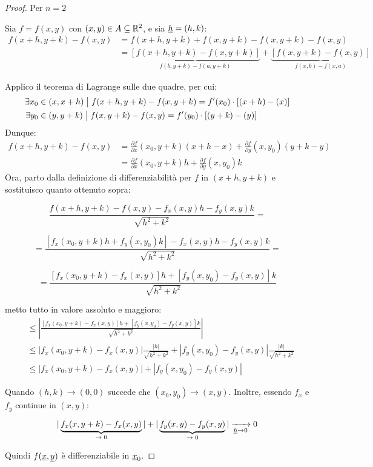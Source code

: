 \begin{proof}
    Per \(n=2\)

    Sia \(f = f(x,y)\) con \((x,y) \in A \subseteq \mathbb{R}^{2}\), e sia \(\underline{h} = (h,k)\):
    \begin{align*}
        f(x+h,y+k) - f(x,y) & = f(x+h,y+k) + f(x,y+k) - f(x,y+k) - f(x,y)                                                                        \\
                            & = \underbrace{[f(x+h,y+k) - f(x,y+k) ]}_{f(b,y+k) - f(a,y+k)} + \underbrace{[f(x,y+k) - f(x,y)]}_{f(x,b) - f(x,a)}
    \end{align*}

    Applico il teorema di Lagrange sulle due quadre, per cui:
    \begin{align*}
        \exists x_0 & \in (x,x+h) \;\big|\; f(x+h,y+k)-f(x,y+k) = f'(x_0) \cdot [(x+h)-(x)] \\
        \exists y_0 & \in (y,y+k) \;\big|\; f(x,y+k)-f(x,y) = f'(y_0) \cdot [(y+k)-(y)]
    \end{align*}
    Dunque:
    \begin{align*}
        f(x+h,y+k) - f(x,y) & = \frac{\partial f}{\partial x}(x_0,y+k) (x +h -x) + \frac{\partial f}{\partial y}(x,y_0) ( y + k -y) \\
                            & = \frac{\partial f}{\partial x}(x_0,y+k) h + \frac{\partial f}{\partial y}(x,y_0)k
    \end{align*}
    Ora, parto dalla definizione di differenziabilità per \(f\) in \((x+h,y+k)\) e sostituisco quanto ottenuto sopra:

    \[
        \frac{f(x+h,y+k) - f(x,y) - f_x(x,y)h - f_y(x,y) k}{\sqrt{h^{2}+k^{2}}} =
    \]

    \[
        = \frac{\left[ f_x(x_0,y+k) h + f_y(x,y_0) k \right] -f_x(x,y)h -f_y(x,y)k}{\sqrt{h^{2}+k^{2}}} =
    \]

    \[
        = \frac{[f_x(x_0,y+k) - f_x(x,y)] h + [f_y(x,y_0) - f_y(x,y)] k}{\sqrt{h^{2}+k^{2}}}
    \]

    metto tutto in valore assoluto e maggioro:
    \begin{align*}
        [\ldots] & \le \left|\frac{[f_x(x_0,y+k) - f_x(x,y)] h + [f_y(x,y_0) - f_y(x,y)] k}{\sqrt{h^{2}+k^{2}}}\right|                      \\
                 & \le |f_x(x_0,y+k) - f_x(x,y)| \frac{|h|}{\sqrt{h^{2}+k^{2}}} + | f_y(x,y_0) - f_y(x,y)| \frac{|k|}{\sqrt{h^{2}+k^{2}}} \\
                 & \le  |f_x(x_0,y+k) - f_x(x,y) | + |f_y(x,y_0) - f_y(x,y) |
    \end{align*}

    \filbreak{}
    Quando \((h,k) \rightarrow (0,0)\) succede che \((x_0,y_0) \rightarrow (x,y)\). Inoltre, essendo \(f_x\) e \(f_y\) continue in \((x,y)\):

    \[
        |\underbrace{f_x(x,y+k) - f_x(x,y)}_\text{\(\rightarrow 0\)} | + |\underbrace{f_y(x,y) - f_y(x,y)}_\text{\(\rightarrow 0\)} | \xrightarrow[\underline{h} \to 0]{} 0
    \]

    Quindi \(f(\underline{x},\underline{y})\) è differenziabile in \(\underline{x}_0\).

\end{proof}


